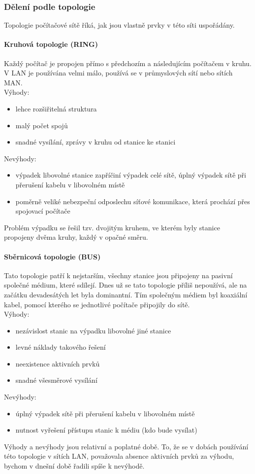 \documentclass[10pt,a4paper]{article}
\begin{document}
\subsubsection{Dělení podle topologie}
Topologie počítačové sítě říká, jak jsou vlastně prvky v této síti uspořádány.
\paragraph{Kruhová topologie (RING)}
Každý počítač je propojen přímo s předchozím a následujícím počítačem v kruhu. V LAN je používána velmi málo, používá se v průmyslových sítí nebo sítích MAN. \\ Výhody:
\begin{itemize}
	\item lehce rozšiřitelná struktura
	\item malý počet spojů
	\item snadné vysílání, zprávy v kruhu od stanice ke stanici
\end{itemize}
Nevýhody:
\begin{itemize}
	\item výpadek libovolné stanice zapříčiní výpadek celé sítě, úplný výpadek sítě při přerušení kabelu v  libovolném místě
	\item poměrně veliké nebezpeční odposlechu síťové komunikace, která prochází přes spojovací počítače
\end{itemize}
Problém výpadku se řešil tzv. dvojitým kruhem, ve kterém byly stanice propojeny dvěma kruhy, každý v opačné směru.
\paragraph{Sběrnicová topologie (BUS)}
Tato topologie patří k nejstarším, všechny stanice jsou připojeny na pasivní společné médium, které sdílejí. Dnes už se tato topologie příliš nepoužívá, ale na začátku devadesátých let byla dominantní. Tím společným médiem byl koaxiální kabel, pomocí kterého se jednotlivé počítače připojily do sítě. \\
Výhody:
\begin{itemize}
	\item nezávislost stanic na výpadku libovolné jiné stanice
	\item levné náklady takového řešení
	\item neexistence aktivních prvků
	\item snadné všesměrové vysílání
\end{itemize}
Nevýhody:
\begin{itemize}
	\item úplný výpadek sítě při přerušení kabelu v libovolném místě
	\item nutnost vyřešení přístupu stanic k médiu (kdo bude vysílat)
\end{itemize}
Výhody a nevýhody jsou relativní a poplatné době. To, že se v dobách používání této topologie v sítích LAN, považovala absence aktivních prvků za výhodu, bychom v dnešní době řadili spíše k nevýhodě.
\end{document}
